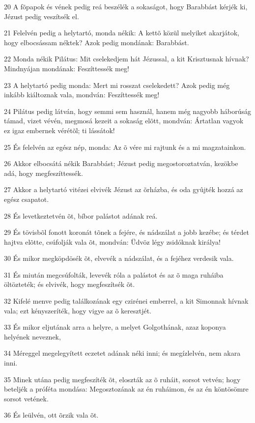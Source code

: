 \par 20 A fõpapok és vének pedig reá beszélék a sokaságot, hogy Barabbást kérjék ki, Jézust pedig veszítsék el.
\par 21 Felelvén pedig a helytartó, monda nékik: A kettõ közül melyiket akarjátok, hogy elbocsássam néktek? Azok pedig mondának: Barabbást.
\par 22 Monda nékik Pilátus: Mit cselekedjem hát Jézussal, a kit Krisztusnak hívnak? Mindnyájan mondának: Feszíttessék meg!
\par 23 A helytartó pedig monda: Mert mi rosszat cselekedett? Azok pedig még inkább kiáltoznak vala, mondván: Feszíttessék meg!
\par 24 Pilátus pedig látván, hogy semmi sem használ, hanem még nagyobb háborúság támad, vizet vévén, megmosá kezeit a sokaság elõtt, mondván: Ártatlan vagyok ez igaz embernek vérétõl; ti lássátok!
\par 25 És felelvén az egész nép, monda: Az õ vére mi rajtunk és a mi magzatainkon.
\par 26 Akkor elbocsátá nékik Barabbást; Jézust pedig megostoroztatván, kezökbe adá, hogy megfeszíttessék.
\par 27 Akkor a helytartó vitézei elvivék Jézust az õrházba, és oda gyûjték hozzá az egész csapatot.
\par 28 És levetkeztetvén õt, bíbor palástot adának reá.
\par 29 És tövisbõl fonott koronát tõnek a fejére, és nádszálat a jobb kezébe; és térdet hajtva elõtte, csúfolják vala õt, mondván: Üdvöz légy zsidóknak királya!
\par 30 És mikor megköpdösék õt, elvevék a nádszálat, és a fejéhez verdesik vala.
\par 31 És miután megcsúfolták, levevék róla a palástot és az õ maga ruháiba öltözteték; és elvivék, hogy megfeszítsék õt.
\par 32 Kifelé menve pedig találkozának egy czirénei emberrel, a kit Simonnak hívnak vala; ezt kényszeríték, hogy vigye az õ keresztjét.
\par 33 És mikor eljutának arra a helyre, a melyet Golgothának, azaz koponya helyének neveznek,
\par 34 Méreggel megelegyített eczetet adának néki inni; és megízlelvén, nem akara inni.
\par 35 Minek utána pedig megfeszíték õt, eloszták az õ ruháit, sorsot vetvén; hogy beteljék a próféta mondása: Megosztozának az én ruháimon, és az én köntösömre sorsot vetének.
\par 36 És leülvén, ott õrzik vala õt.
